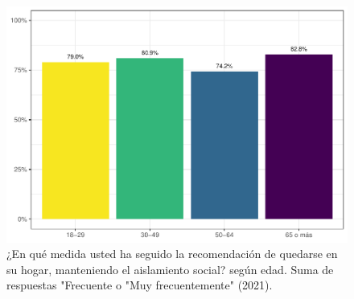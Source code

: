 \documentclass[
  12pt,
]{book}
\begin{document}
\begin{figure}

{\centering \includegraphics{reporte-elsoc_files/figure-latex/dist-edad-1} 

}

\caption{¿En qué medida usted ha seguido la recomendación de quedarse en su hogar, manteniendo el aislamiento social? según edad. Suma de respuestas "Frecuente o "Muy frecuentemente" (2021).}\label{fig:dist-edad}
\end{figure}
\end{document}
